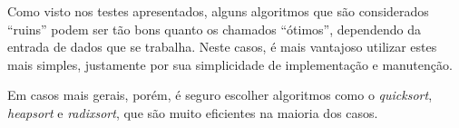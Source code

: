 \documentclass[
	11pt,
	oneside,
	a4paper,
	english,
	brazil,
	]{article}
\begin{document}
Como visto nos testes apresentados, alguns algoritmos que são considerados
``ruins'' podem ser tão bons quanto os chamados ``ótimos'', dependendo da
entrada de dados que se trabalha. Neste casos, é mais vantajoso utilizar
estes mais simples, justamente por sua simplicidade de implementação e
manutenção.

Em casos mais gerais, porém, é seguro escolher algoritmos como o
\textit{quicksort}, \textit{heapsort} e \textit{radixsort}, que são muito 
eficientes na maioria dos casos.

{}

\end{document}
